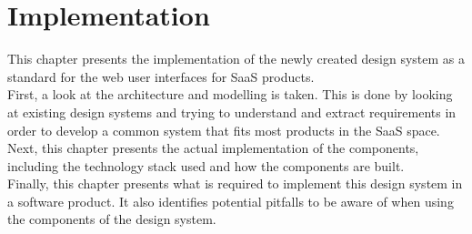\newpage
\section{Implementation}
This chapter presents the implementation of the newly created design system as a standard for the web user interfaces for SaaS products. \\
First, a look at the architecture and modelling is taken. This is done by looking at existing design systems and trying to understand and extract requirements in order to develop a common system that fits most products in the SaaS space. \\
Next, this chapter presents the actual implementation of the components, including the technology stack used and how the components are built. \\
Finally, this chapter presents what is required to implement this design system in a software product. It also identifies potential pitfalls to be aware of when using the components of the design system. \\


